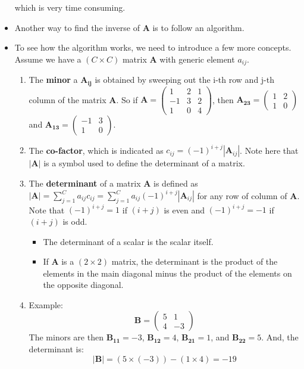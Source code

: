 \documentclass[11pt]{article}
\theoremstyle{definition}
\theoremstyle{remark}
\begin{document}
\begin{itemize}
which is very time consuming.
\item Another way to find the inverse of $\mathbf{A}$ is to follow an algorithm.
\item To see how the algorithm works, we need to introduce a few more concepts. Assume we have a $(C \times C)$ matrix \textbf{A} with generic element $a_{ij}$.
\begin{enumerate}
\item The \textbf{minor} a $\mathbf{A_{ij}}$ is obtained by sweeping out the i-th row and j-th column of the matrix \textbf{A}. So if
$\mathbf{A} = 
\begin{pmatrix} 
1&2&1 \\ -1&3&2 \\ 1&0&4
\end{pmatrix} $, then $\mathbf{A_{23}} = \begin{pmatrix} 1&2 \\ 1&0 \end{pmatrix}$ and $\mathbf{A_{13}} = \begin{pmatrix} -1&3 \\ 1&0 \end{pmatrix}$.
\item The \textbf{co-factor}, which is indicated as $c_{ij} = (-1)^{i+j}|\mathbf{A}_{ij}|$. Note here that $|\textbf{A}|$ is a symbol used to define the determinant  of a matrix.
\item The \textbf{determinant} of a matrix \textbf{A} is defined as $|\textbf{A}| = \sum_{j=1}^{C} a_{ij}c_{ij} = \sum_{j=1}^{C} a_{ij}(-1)^{i+j}|\mathbf{A}_{ij}| $ for any row of column of \textbf{A}. Note that $(-1)^{i+j} = 1$ if $(i+j)$ is even and $(-1)^{i+j} = -1$ if $(i+j)$ is odd. 
\begin{itemize}
\item The determinant of a scalar is the scalar itself. 
\item If \textbf{A} is a $(2 \times 2)$ matrix, the determinant is the product of the elements in the main diagonal minus the product of the elements on the opposite diagonal.
\end{itemize}
\item Example: 
$$
\mathbf{B} = 
\begin{pmatrix}
5&1 \\
4&-3
\end{pmatrix}
$$
The minors are then $\mathbf{B_{11}} = -3$, $\mathbf{B_{12}} = 4$, $\mathbf{B_{21}} = 1$, and $\mathbf{B_{22}} = 5$. And, the determinant is:
$$
|\mathbf{B}| = (5 \times (-3)) - (1 \times 4) = -19
$$

\end{enumerate}
\end{itemize}
\end{document}
